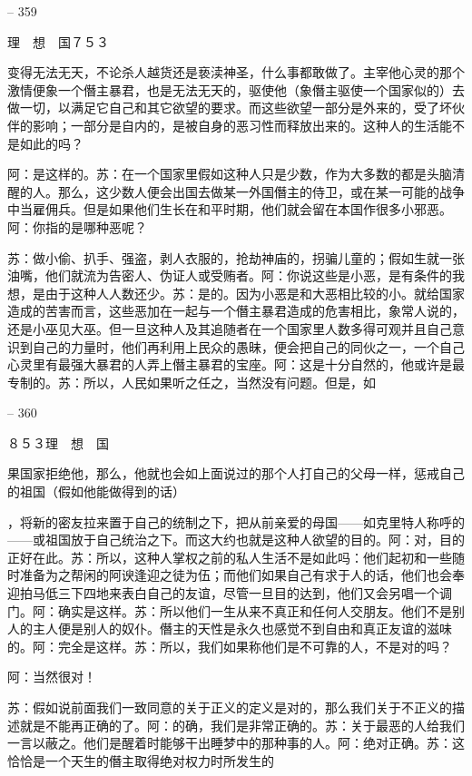\documentclass[11pt,oneside]{book}
\begin{document}
\begin{common-format}
    

-- 359

    理　想　国７５３

    变得无法无天，不论杀人越货还是亵渎神圣，什么事都敢做了。主宰他心灵的那个激情便象一个僭主暴君，也是无法无天的，驱使他（象僭主驱使一个国家似的）去做一切，以满足它自己和其它欲望的要求。而这些欲望一部分是外来的，受了坏伙伴的影响；一部分是自内的，是被自身的恶习性而释放出来的。这种人的生活能不是如此的吗？

    阿：是这样的。苏：在一个国家里假如这种人只是少数，作为大多数的都是头脑清醒的人。那么，这少数人便会出国去做某一外国僭主的侍卫，或在某一可能的战争中当雇佣兵。但是如果他们生长在和平时期，他们就会留在本国作很多小邪恶。阿：你指的是哪种恶呢？

    苏：做小偷、扒手、强盗，剥人衣服的，抢劫神庙的，拐骗儿童的；假如生就一张油嘴，他们就流为告密人、伪证人或受贿者。阿：你说这些是小恶，是有条件的我想，是由于这种人人数还少。苏：是的。因为小恶是和大恶相比较的小。就给国家造成的苦害而言，这些恶加在一起与一个僭主暴君造成的危害相比，象常人说的，还是小巫见大巫。但一旦这种人及其追随者在一个国家里人数多得可观并且自己意识到自己的力量时，他们再利用上民众的愚昧，便会把自己的同伙之一，一个自己心灵里有最强大暴君的人弄上僭主暴君的宝座。阿：这是十分自然的，他或许是最专制的。苏：所以，人民如果听之任之，当然没有问题。但是，如

    

-- 360

    ８５３理　想　国

    果国家拒绝他，那么，他就也会如上面说过的那个人打自己的父母一样，惩戒自己的祖国（假如他能做得到的话）

    ，将新的密友拉来置于自己的统制之下，把从前亲爱的母国——如克里特人称呼的——或祖国放于自己统治之下。而这大约也就是这种人欲望的目的。阿：对，目的正好在此。苏：所以，这种人掌权之前的私人生活不是如此吗：他们起初和一些随时准备为之帮闲的阿谀逢迎之徒为伍；而他们如果自己有求于人的话，他们也会奉迎拍马低三下四地来表白自己的友谊，尽管一旦目的达到，他们又会另唱一个调门。阿：确实是这样。苏：所以他们一生从来不真正和任何人交朋友。他们不是别人的主人便是别人的奴仆。僭主的天性是永久也感觉不到自由和真正友谊的滋味的。阿：完全是这样。苏：所以，我们如果称他们是不可靠的人，不是对的吗？

    阿：当然很对！

    苏：假如说前面我们一致同意的关于正义的定义是对的，那么我们关于不正义的描述就是不能再正确的了。阿：的确，我们是非常正确的。苏：关于最恶的人给我们一言以蔽之。他们是醒着时能够干出睡梦中的那种事的人。阿：绝对正确。苏：这恰恰是一个天生的僭主取得绝对权力时所发生的


\end{common-format}
\end{document}

